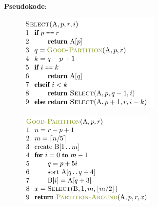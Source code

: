 \documentclass[12pt]{report}
\begin{document}
\vspace{\baselineskip}
{\fontsize{13pt}{15.6pt}\selectfont \textbf{Pseudokode}: \par}\par


\vspace{\baselineskip}
\begin{multicols}{2}



\begin{figure}[H]
	\begin{Center}
		\includegraphics[width=2.79in,height=1.9in]{./media/image43.png}
	\end{Center}
\end{figure}



\par


\vspace{\baselineskip}



\begin{figure}[H]
	\begin{Center}
		\includegraphics[width=2.7in,height=1.85in]{./media/image44.png}
	\end{Center}
\end{figure}




\end{multicols}
\end{document}
